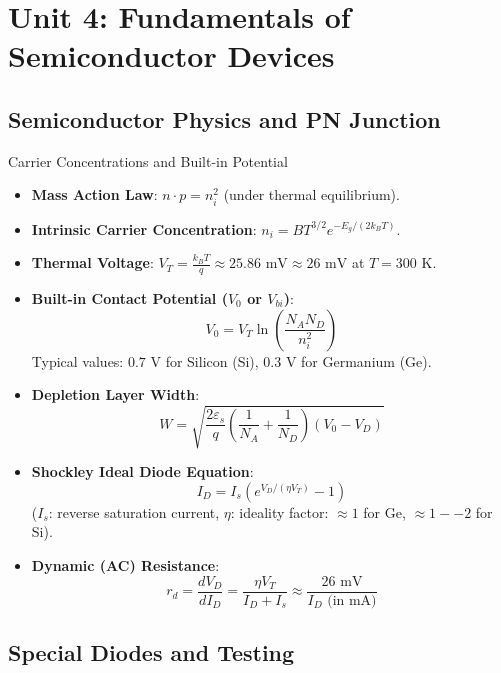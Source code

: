 \chapter{Unit 4: Fundamentals of Semiconductor Devices}

\section{Semiconductor Physics and PN Junction}

\begin{formulabox}{Carrier Concentrations and Built-in Potential}
\begin{itemize}[leftmargin=1.5em]
    \item \textbf{Mass Action Law}: $n \cdot p = n_i^2$ (under thermal equilibrium).
    \item \textbf{Intrinsic Carrier Concentration}: $n_i = B T^{3/2} e^{-E_g / (2 k_B T)}$.
    \item \textbf{Thermal Voltage}: $V_T = \frac{k_B T}{q} \approx 25.86\text{ mV} \approx 26\text{ mV}$ at $T = 300\text{ K}$.
    \item \textbf{Built-in Contact Potential ($V_0$ or $V_{bi}$)}:
    \[ V_0 = V_T \ln\left(\frac{N_A N_D}{n_i^2}\right) \]
    Typical values: $0.7\text{ V}$ for Silicon (Si), $0.3\text{ V}$ for Germanium (Ge).
    \item \textbf{Depletion Layer Width}:
    \[ W = \sqrt{\frac{2 \varepsilon_s}{q}\left(\frac{1}{N_A} + \frac{1}{N_D}\right)(V_0 - V_D)} \]
    \item \textbf{Shockley Ideal Diode Equation}:
    \[ I_D = I_s \left( e^{V_D / (\eta V_T)} - 1 \right) \]
    ($I_s$: reverse saturation current, $\eta$: ideality factor: $\approx 1$ for Ge, $\approx 1--2$ for Si).
    \item \textbf{Dynamic (AC) Resistance}:
    \[ r_d = \frac{d V_D}{d I_D} = \frac{\eta V_T}{I_D + I_s} \approx \frac{26\text{ mV}}{I_D\text{ (in mA)}} \]
\end{itemize}
\end{formulabox}

\section{Special Diodes and Testing}

